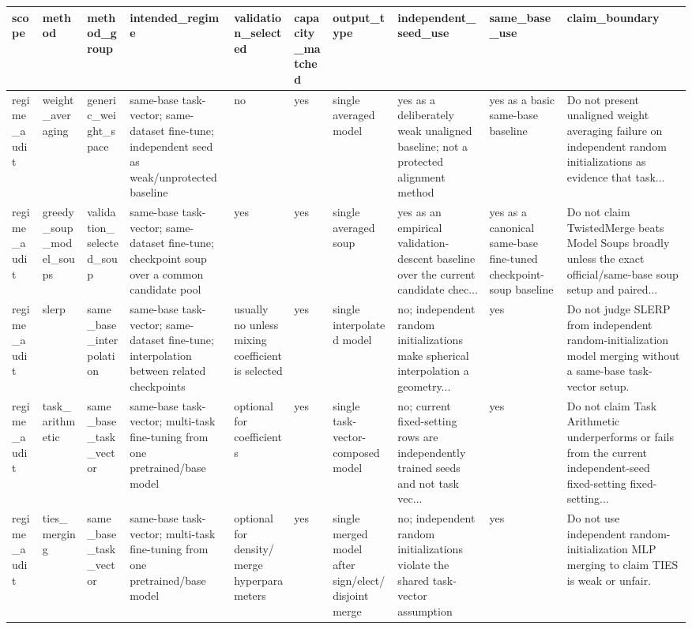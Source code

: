 \begin{tabular}{llllllllll}
\toprule
scope & method & method\_group & intended\_regime & validation\_selected & capacity\_matched & output\_type & independent\_seed\_use & same\_base\_use & claim\_boundary \\
\midrule
regime\_audit & weight\_averaging & generic\_weight\_space & same-base task-vector; same-dataset fine-tune; independent seed as weak/unprotected baseline & no & yes & single averaged model & yes as a deliberately weak unaligned baseline; not a protected alignment method & yes as a basic same-base baseline & Do not present unaligned weight averaging failure on independent random initializations as evidence that task... \\
regime\_audit & greedy\_soup\_model\_soups & validation\_selected\_soup & same-base task-vector; same-dataset fine-tune; checkpoint soup over a common candidate pool & yes & yes & single averaged soup & yes as an empirical validation-descent baseline over the current candidate chec... & yes as a canonical same-base fine-tuned checkpoint-soup baseline & Do not claim TwistedMerge beats Model Soups broadly unless the exact official/same-base soup setup and paired... \\
regime\_audit & slerp & same\_base\_interpolation & same-base task-vector; same-dataset fine-tune; interpolation between related checkpoints & usually no unless mixing coefficient is selected & yes & single interpolated model & no; independent random initializations make spherical interpolation a geometry... & yes & Do not judge SLERP from independent random-initialization model merging without a same-base task-vector setup. \\
regime\_audit & task\_arithmetic & same\_base\_task\_vector & same-base task-vector; multi-task fine-tuning from one pretrained/base model & optional for coefficients & yes & single task-vector-composed model & no; current fixed-setting rows are independently trained seeds and not task vec... & yes & Do not claim Task Arithmetic underperforms or fails from the current independent-seed fixed-setting fixed-setting... \\
regime\_audit & ties\_merging & same\_base\_task\_vector & same-base task-vector; multi-task fine-tuning from one pretrained/base model & optional for density/merge hyperparameters & yes & single merged model after sign/elect/disjoint merge & no; independent random initializations violate the shared task-vector assumption & yes & Do not use independent random-initialization MLP merging to claim TIES is weak or unfair. \\

\end{tabular}
